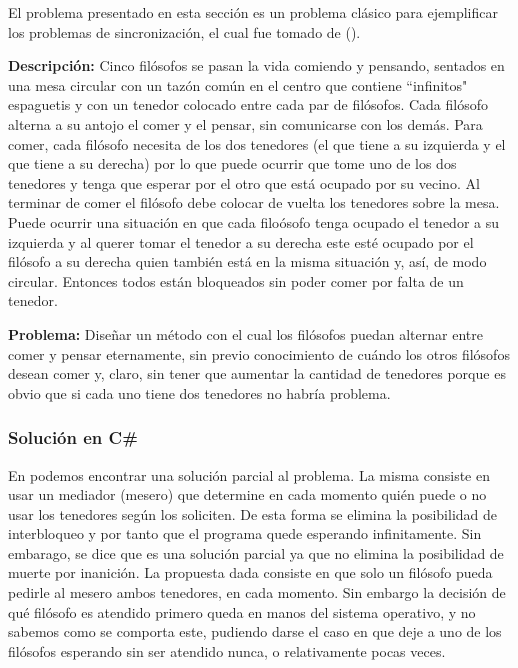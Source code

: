 \documentclass[10pt]{article} %
\begin{document}
El problema presentado en esta secci\'on es un problema cl\'asico para ejemplificar los problemas de sincronizaci\'on,  el cual fue tomado de (\cite[Ep\'igrafe 17.7.2.1]{katrip}).

\textbf{Descripci\'on:} Cinco fil\'osofos se pasan la vida comiendo y pensando, sentados en una mesa circular con un taz\'on com\'un en el centro que contiene ``infinitos" espaguetis y con un tenedor colocado entre cada par de fil\'osofos. Cada fil\'osofo alterna a su antojo el comer y el pensar, sin comunicarse con los dem\'as. Para comer, cada fil\'osofo necesita de los dos tenedores (el que tiene a su izquierda y el que tiene a su derecha) por lo que puede ocurrir que tome uno de los dos tenedores y tenga que esperar por el otro que est\'a ocupado por su vecino. Al terminar de comer el fil\'osofo debe colocar de vuelta los tenedores sobre la mesa. Puede ocurrir una situaci\'on en que cada filo\'osofo tenga ocupado el tenedor a su izquierda y al querer tomar el tenedor a su derecha este est\'e ocupado por el fil\'osofo a su derecha quien tambi\'en est\'a en la misma situaci\'on y, as\'i, de modo circular. Entonces todos est\'an bloqueados sin poder comer por falta de un tenedor.

\textbf{Problema:} Dise\~nar un m\'etodo con el cual los fil\'osofos puedan alternar entre comer y pensar eternamente, sin previo conocimiento de cu\'ando los otros fil\'osofos desean comer y, claro, sin tener que aumentar la cantidad de tenedores porque es obvio que si cada uno tiene dos tenedores no habr\'ia problema.

\subsubsection{Soluci\'on en C\#}

En \cite[Ep\'igrafe 17.7.2.2]{katrib} podemos encontrar una soluci\'on parcial al problema. La misma consiste en usar un mediador (mesero) que determine en cada momento qui\'en puede o no usar los tenedores seg\'un los soliciten. De esta forma se elimina la posibilidad de interbloqueo y por tanto que el programa quede esperando infinitamente. Sin embarago, se dice que es una soluci\'on parcial ya que no elimina la posibilidad de muerte por inanici\'on. La propuesta dada consiste en que solo un fil\'osofo pueda pedirle al mesero ambos tenedores, en cada momento. Sin embargo la decisi\'on de qu\'e fil\'osofo es atendido primero queda en manos del sistema operativo, y no sabemos como se comporta este, pudiendo darse el caso en que deje a uno de los fil\'osofos esperando sin ser atendido nunca, o relativamente pocas veces.
\end{document}
